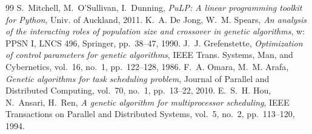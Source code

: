 \documentclass[pdflatex,sn-mathphys,Numbered]{sn-jnl}
\begin{document}
\begin{thebibliography}{99}
 S.~Mitchell, M.~O'Sullivan, I.~Dunning, \textit{PuLP: A linear programming toolkit for Python}, Univ. of Auckland, 2011.
 K.~A. De Jong, W.~M. Spears, \textit{An analysis of the interacting roles of population size and crossover in genetic algorithms}, w: PPSN I, LNCS 496, Springer, pp.~38--47, 1990.
 J.~J. Grefenstette, \textit{Optimization of control parameters for genetic algorithms}, IEEE Trans. Systems, Man, and Cybernetics, vol.~16, no.~1, pp.~122--128, 1986.
 F.~A. Omara, M.~M. Arafa, \textit{Genetic algorithms for task scheduling problem}, Journal of Parallel and Distributed Computing, vol.~70, no.~1, pp.~13--22, 2010.
 E.~S.~H. Hou, N.~Ansari, H.~Ren, \textit{A genetic algorithm for multiprocessor scheduling}, IEEE Transactions on Parallel and Distributed Systems, vol.~5, no.~2, pp.~113--120, 1994.
\end{thebibliography}
\end{document}
